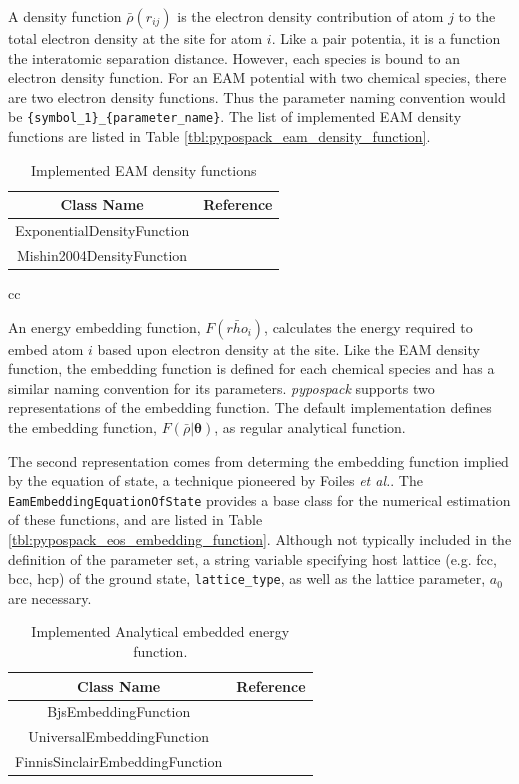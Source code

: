   A density function $\bar{\rho}(r_{ij})$ is the electron density contribution of atom $j$ to the total electron density at the site for atom $i$.  Like a pair potentia, it is a function the interatomic separation distance.  However, each species is bound to an electron density function.  For an EAM potential with two chemical species, there are two electron density functions.  Thus the parameter naming convention would be \verb|{symbol_1}_{parameter_name}|.
	The list of implemented EAM density functions are listed in Table \ref{tbl:pypospack_eam_density_function}.

\begin{table}[ht]
	\centering
	\caption{Implemented EAM density functions}
	\begin{tabular}{cc}
		\hline
		{Class Name} & {Reference} \\
		\hline
		ExponentialDensityFunction & \\
		Mishin2004DensityFunction & \cite{mishin2004_eam_NiAl} \\
		\hline
	\end{tabular}{cc}
\end{table}

An energy embedding function, $F(\bar{rho}_i)$, calculates the energy required to embed atom $i$ based upon electron density at the site.  Like the EAM density function, the embedding function is defined for each chemical species and has a similar naming convention for its parameters.
\emph{pypospack} supports two representations of the embedding function.
The default implementation defines the embedding function, $F(\bar{\rho}|\bm{\theta})$, as regular analytical function.

The second representation comes from determing the embedding function implied by the equation of state, a technique pioneered by Foiles \emph{et al.}\cite{foiles1986_eam_embedded_eos}.
The \verb|EamEmbeddingEquationOfState| provides a base class for the numerical estimation of these functions, and are listed in Table \ref{tbl:pypospack_eos_embedding_function}.
Although not typically included in the definition of the parameter set, a string variable specifying host lattice (e.g. fcc, bcc, hcp) of the ground state, \verb|lattice_type|, as well as the lattice parameter, $a_0$ are necessary.

\begin{table}[ht]
	\centering
	\caption{Implemented Analytical embedded energy function.}
	\label{tbl:pypospack_embedding_function}
	\begin{tabular}{cc}
		\hline
		{Class Name} & Reference \\
		\hline
		BjsEmbeddingFunction & \\
		UniversalEmbeddingFunction & \\
		FinnisSinclairEmbeddingFunction & \\
		\hline
	\end{tabular}
\end{table}

